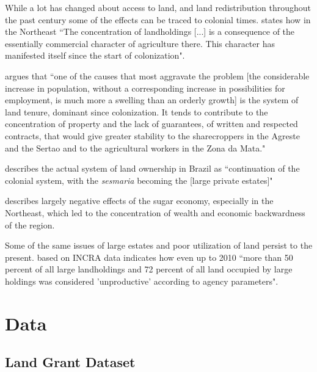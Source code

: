 \documentclass{article}
\begin{document}
While a lot has changed about access to land, and land redistribution throughout the past century some of the effects can be traced to colonial times.
\textcite[p.~36]{De_Oliveira_Andrade1980-xz} states how in the Northeast 
``The concentration of landholdings [...] is a consequence of the essentially commercial character of agriculture there. This character has manifested itself since the start of colonization". 

\textcite[p.~34-35]{De_Oliveira_Andrade1980-xz} argues that 
``one of the causes that most aggravate the problem [the considerable increase in population, without a corresponding increase in possibilities for employment, is much more a swelling than an orderly growth] is the system of land tenure, dominant since colonization. It tends to contribute to the concentration of property and the lack of guarantees, of written and respected contracts, that would give greater stability to the sharecroppers in the Agreste and the Sertao and to the agricultural workers in the Zona da Mata."

\textcite[p.~18]{Andrade1980-zd} describes the actual system of land ownership in Brazil as ``continuation of the colonial system, with the \textit{sesmaria} becoming the [large private estates]"

\textcite[p.~16]{Baer2014-gh} describes largely negative effects of the sugar economy, especially in the Northeast, which led to the concentration of wealth and economic backwardness of the region.

Some of the same issues of large estates and poor utilization of land persist to the present. \textcite{Carlson2019-mk} based on INCRA data indicates how even up to 2010 ``more than 50 percent of all large landholdings and 72 percent of all land occupied by large holdings was considered 'unproductive' according to agency parameters".

\section{Data}
\label{sec:data}

\subsection{Land Grant Dataset}
\end{document}
